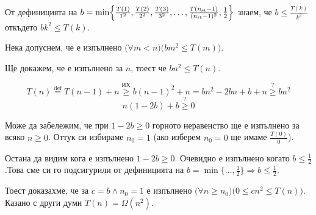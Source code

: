 \begin{solution}
\begin{itemize}
\begin{base}
			От дефиницията на $b=\min\Bigl\{\frac{T(1)}{1^2},\frac{T(2)}{2^2},\frac{T(3)}{3^2},\dots,\frac{T(n_{\text{st}}-1)}{({n_{\text{st}}-1)^2}},\frac12\Bigr\}$ знаем, че $b\le \frac{T(k)}{k^2}$ откъдето $bk^2\le T(k)$.
		\end{base}
		
		\begin{indhypothesis}
			Нека допуснем, че е изпълнено $\big(\forall m<n\big)\big(bm^2\le T(m)\big)$.
		\end{indhypothesis}
	
	\begin{indstep}
		Ще докажем, че е изпълнено за $n$, тоест че $bn^2\le T(n)$.
		
		\begin{equation*}
			T(n)\overset{\text{def}}{=}T(n-1)+n\overset{\text{ИХ}}{\ge}b(n-1)^2+n=bn^2-2bn+b+n\overset{?}{\ge}bn^2
		\end{equation*}
		\begin{equation*}
			n(1-2b)+b\overset{?}{\ge}0
		\end{equation*}
	
		Може да забележим, че при $1-2b\ge0$ горното неравенство ще е изпълнено за всяко $n\ge0$. Оттук си избираме $n_0=1$ (ако изберем $n_0=0$ ще имаме $\frac{T(0)}{0}$).
		
		Остана да видим кога е изпълнено $1-2b\ge0$. Очевидно е изпълнено когато $b\le\frac12$.\qquad Това сме си го подсигурили от дефиницията на $b=\min\{\dots,\frac12\}\Rightarrow b\le\frac12$.
	\end{indstep}

	Тоест доказахме, че за $c=b\land n_0=1$ е изпълнено $\big(\forall n\ge n_0\big)\big(0\le cn^2\le T(n)\big)$. Казано с други думи $T(n)=\Omega(n^2)$.
		
	\end{itemize}
\end{solution}

\newpage

